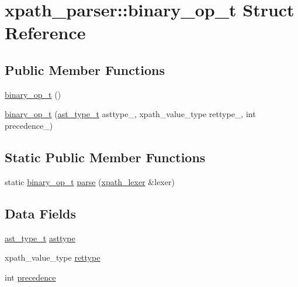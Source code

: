 \hypertarget{structxpath__parser_1_1binary__op__t}{
\section{xpath\_\-parser::binary\_\-op\_\-t Struct Reference}
\label{structxpath__parser_1_1binary__op__t}
}
\subsection*{Public Member Functions}
\begin{CompactItemize}
\item 
\hyperlink{structxpath__parser_1_1binary__op__t_18cac63911120c27f5ee842b1e6afe35}{binary\_\-op\_\-t} ()
\item 
\hyperlink{structxpath__parser_1_1binary__op__t_6b8a545436af8aa0c74c91e181a2b865}{binary\_\-op\_\-t} (\hyperlink{pugixml_8cpp_11258a240266b84b6b0526930e5d330d}{ast\_\-type\_\-t} asttype\_\-, xpath\_\-value\_\-type rettype\_\-, int precedence\_\-)
\end{CompactItemize}
\subsection*{Static Public Member Functions}
\begin{CompactItemize}
\item 
static \hyperlink{structxpath__parser_1_1binary__op__t}{binary\_\-op\_\-t} \hyperlink{structxpath__parser_1_1binary__op__t_723f5f2b66df47b4ac74455cb39b9544}{parse} (\hyperlink{classxpath__lexer}{xpath\_\-lexer} \&lexer)
\end{CompactItemize}
\subsection*{Data Fields}
\begin{CompactItemize}
\item 
\hyperlink{pugixml_8cpp_11258a240266b84b6b0526930e5d330d}{ast\_\-type\_\-t} \hyperlink{structxpath__parser_1_1binary__op__t_1af7e302de46bf45ffdb466cfd89fa15}{asttype}
\item 
xpath\_\-value\_\-type \hyperlink{structxpath__parser_1_1binary__op__t_02c18d8d6d9a7ef28b2fefcb900e75bc}{rettype}
\item 
int \hyperlink{structxpath__parser_1_1binary__op__t_422064e11cc65c6110c422568441b69c}{precedence}
\end{CompactItemize}


